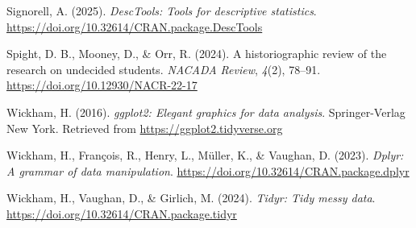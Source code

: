 \documentclass[
  english,
  man,floatsintext]{apa6}
\newlength{\cslhangindent}
\newenvironment{CSLReferences}[2] %
 {\begin{list}{}{%
  \setlength{\itemindent}{0pt}
  \setlength{\leftmargin}{0pt}
  \setlength{\parsep}{0pt}
  \ifodd #1
   \setlength{\leftmargin}{\cslhangindent}
   \setlength{\itemindent}{-1\cslhangindent}
  \fi
  \setlength{\itemsep}{#2\baselineskip}}}
 {\end{list}}
\begin{document}
\begin{CSLReferences}{1}{0}
Signorell, A. (2025). \emph{DescTools: Tools for descriptive statistics}. \url{https://doi.org/10.32614/CRAN.package.DescTools}

Spight, D. B., Mooney, D., \& Orr, R. (2024). A historiographic review of the research on undecided students. \emph{NACADA Review}, \emph{4}(2), 78--91. \url{https://doi.org/10.12930/NACR-22-17}

Wickham, H. (2016). \emph{ggplot2: Elegant graphics for data analysis}. Springer-Verlag New York. Retrieved from \url{https://ggplot2.tidyverse.org}

Wickham, H., François, R., Henry, L., Müller, K., \& Vaughan, D. (2023). \emph{Dplyr: A grammar of data manipulation}. \url{https://doi.org/10.32614/CRAN.package.dplyr}

Wickham, H., Vaughan, D., \& Girlich, M. (2024). \emph{Tidyr: Tidy messy data}. \url{https://doi.org/10.32614/CRAN.package.tidyr}

\end{CSLReferences}
\end{document}
